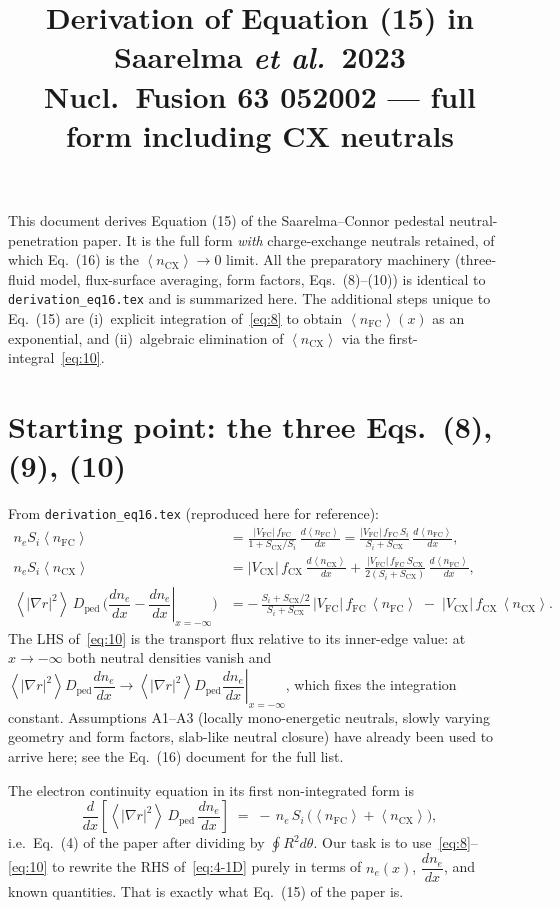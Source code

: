 \documentclass[11pt]{article}
\title{Derivation of Equation (15) in Saarelma \emph{et al.}~2023\\
  \large Nucl.\ Fusion \textbf{63} 052002 --- full form including CX neutrals}
\author{}
\date{}
\renewcommand{\ne}{n_{e}}  %
\newcommand{\nfc}{n_{\mathrm{FC}}}
\newcommand{\ncx}{n_{\mathrm{CX}}}
\newcommand{\Vfc}{\lvert V_{\mathrm{FC}}\rvert}
\newcommand{\Vcx}{\lvert V_{\mathrm{CX}}\rvert}
\newcommand{\Si}{S_{i}}
\newcommand{\Scx}{S_{\mathrm{CX}}}
\newcommand{\Dped}{D_{\mathrm{ped}}}
\newcommand{\fFC}{f_{\mathrm{FC}}}
\newcommand{\fCX}{f_{\mathrm{CX}}}
\newcommand{\fsa}[1]{\left\langle #1 \right\rangle}
\newcommand{\gradrsq}{\fsa{|\nabla r|^{2}}}
\newcommand{\neginf}{x=-\infty}
\newcommand{\dneneg}{\left.\dfrac{d\ne}{dx}\right|_{\neginf}}
\newcommand{\dnexnow}{\dfrac{d\ne}{dx}}
\newcommand{\Afactor}{\Vfc\,\fFC}
\newcommand{\Bfactor}{\Vcx\,\fCX}
\begin{document}
\maketitle

This document derives Equation (15) of the Saarelma--Connor pedestal
neutral-penetration paper.  It is the full form \emph{with} charge-exchange
neutrals retained, of which Eq.~(16) is the $\fsa{\ncx}\to 0$ limit.
All the preparatory machinery (three-fluid model, flux-surface averaging,
form factors, Eqs.~(8)--(10)) is identical to \texttt{derivation\_eq16.tex}
and is summarized here.  The additional steps unique to Eq.~(15) are
(i)~explicit integration of~\eqref{eq:8} to obtain $\fsa{\nfc}(x)$ as
an exponential, and (ii)~algebraic elimination of $\fsa{\ncx}$ via the
first-integral~\eqref{eq:10}.

\section{Starting point: the three Eqs.~(8), (9), (10)}
\label{sec:start}

From \texttt{derivation\_eq16.tex} (reproduced here for reference):
\begin{align}
  \ne\Si\fsa{\nfc}
    &= \frac{\Afactor}{1+\Scx/\Si}\,\frac{d\fsa{\nfc}}{dx}
     = \frac{\Afactor\,\Si}{\Si+\Scx}\,\frac{d\fsa{\nfc}}{dx}, \label{eq:8}\\[4pt]
  \ne\Si\fsa{\ncx}
    &= \Bfactor\,\frac{d\fsa{\ncx}}{dx}
     + \frac{\Afactor\,\Scx}{2(\Si+\Scx)}\,\frac{d\fsa{\nfc}}{dx}, \label{eq:9}\\[4pt]
  \gradrsq\,\Dped\,\bigl(\dnexnow - \dneneg\bigr)
    &= -\,\frac{\Si+\Scx/2}{\Si+\Scx}\,\Afactor\,\fsa{\nfc}
       \;-\; \Bfactor\,\fsa{\ncx}. \label{eq:10}
\end{align}
The LHS of~\eqref{eq:10} is the transport flux relative to its inner-edge
value: at $x\to-\infty$ both neutral densities vanish and
$\gradrsq\Dped\dnexnow\to\gradrsq\Dped\dneneg$, which fixes the integration
constant.  Assumptions A1--A3 (locally mono-energetic neutrals, slowly
varying geometry and form factors, slab-like neutral closure) have
already been used to arrive here; see the Eq.~(16) document for the full
list.

The electron continuity equation in its first non-integrated form is
\begin{equation}
  \frac{d}{dx}\!\left[\gradrsq\,\Dped\,\dnexnow\right]
    \;=\; -\,\ne\,\Si\,\bigl(\fsa{\nfc}+\fsa{\ncx}\bigr),
  \label{eq:4-1D}
\end{equation}
i.e.\ Eq.~(4) of the paper after dividing by $\oint R^{2}d\theta$.  Our
task is to use~\eqref{eq:8}--\eqref{eq:10} to rewrite the RHS
of~\eqref{eq:4-1D} purely in terms of $\ne(x)$, $\dnexnow$, and known
quantities.  That is exactly what Eq.~(15) of the paper is.
\end{document}

